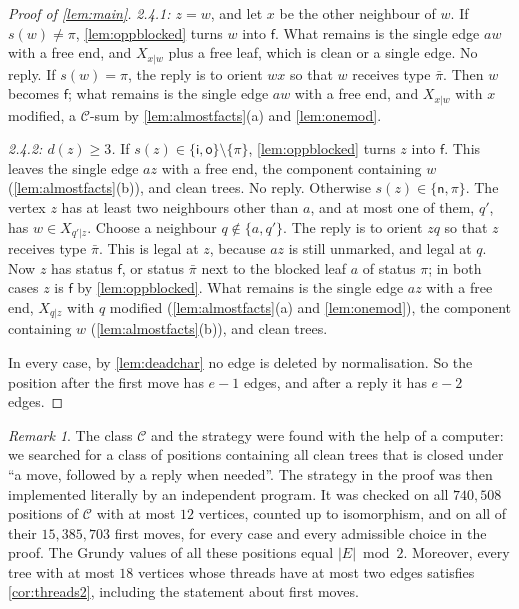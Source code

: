 \documentclass[11pt]{amsart}
\theoremstyle{definition}
\theoremstyle{remark}
\newtheorem{remark}[theorem]{Remark}
\newcommand{\sn}{\mathsf{n}}
\newcommand{\si}{\mathsf{i}}
\newcommand{\so}{\mathsf{o}}
\newcommand{\sff}{\mathsf{f}}
\begin{document}
\begin{proof}[Proof of \cref{lem:main}]
\emph{2.4.1: $z=w$}, and let $x$ be the other neighbour of $w$. If $s(w)\neq\pi$,
\cref{lem:oppblocked} turns $w$ into $\sff$. What remains is the single edge $aw$ with a free end,
and $X_{x|w}$ plus a free leaf, which is clean or a single edge. No reply. If $s(w)=\pi$, the reply is to orient
$wx$ so that $w$ receives type $\bar\pi$. Then $w$ becomes $\sff$; what remains is the single edge
$aw$ with a free end, and $X_{x|w}$ with $x$ modified, a $\mathcal C$-sum by
\cref{lem:almostfacts}(a) and \cref{lem:onemod}.

\emph{2.4.2: $d(z)\ge3$.} If $s(z)\in\{\si,\so\}\setminus\{\pi\}$, \cref{lem:oppblocked} turns $z$
into $\sff$. This leaves the single edge $az$ with a free end, the component containing $w$
(\cref{lem:almostfacts}(b)), and clean trees. No reply. Otherwise $s(z)\in\{\sn,\pi\}$. The vertex
$z$ has at least two neighbours other than $a$, and at most one of them, $q'$, has $w\in X_{q'|z}$.
Choose a neighbour $q\notin\{a,q'\}$. The reply is to orient $zq$ so that $z$ receives type
$\bar\pi$. This is legal at $z$, because $az$ is still unmarked, and legal at $q$. Now $z$ has
status $\sff$, or status $\bar\pi$ next to the blocked leaf $a$ of status $\pi$; in both cases $z$
is $\sff$ by \cref{lem:oppblocked}. What remains is the single edge $az$ with a free end,
$X_{q|z}$ with $q$ modified (\cref{lem:almostfacts}(a) and \cref{lem:onemod}), the component
containing $w$ (\cref{lem:almostfacts}(b)), and clean trees.

In every case, by \cref{lem:deadchar} no edge is deleted by normalisation. So the position after
the first move has $e-1$ edges, and after a reply it has $e-2$ edges.
\end{proof}

\begin{remark}
The class $\mathcal C$ and the strategy were found with the help of a computer: we searched for a class of positions containing all clean trees that is closed under ``a move, followed by a reply when needed''. The strategy in the proof was then implemented literally by an independent program. It was checked on all $740{,}508$ positions of $\mathcal C$ with at most $12$ vertices, counted up to isomorphism, and on all of their $15{,}385{,}703$ first moves, for every case and every admissible choice in the proof. The Grundy values of all these positions equal $|E|\bmod 2$. Moreover, every tree with at most $18$ vertices whose threads have at most two edges satisfies \cref{cor:threads2}, including the statement about first moves.
\end{remark}
\end{document}
